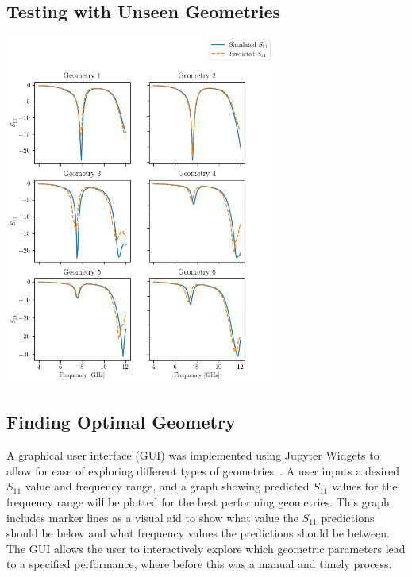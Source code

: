 \documentclass[conference]{IEEEtran}
\newenvironment{Figure}
    {\par\medskip\noindent\minipage{\linewidth}}
    {\endminipage\par\medskip}
\begin{document}
\subsection{Testing with Unseen Geometries}
\begin{Figure}
    \centering
    \includegraphics[width=3.5in]{unseen_geometries_freq_vs_seq}
    \label{unseen_geometries_graph}
\end{Figure}





\subsection{Finding Optimal Geometry}
A graphical user interface (GUI) was implemented using Jupyter Widgets to allow for ease of exploring different types of geometries~\cite{interactive_Jupyter_widgets}. A user inputs a desired $S_{11}$ value and frequency range, and a graph showing predicted $S_{11}$ values for the frequency range will be plotted for the best performing geometries. This graph includes marker lines as a visual aid to show what value the $S_{11}$ predictions should be below and what frequency values the predictions should be between. The GUI allows the user to interactively explore which geometric parameters lead to a specified performance, where before this was a manual and timely process.  
\end{document}
